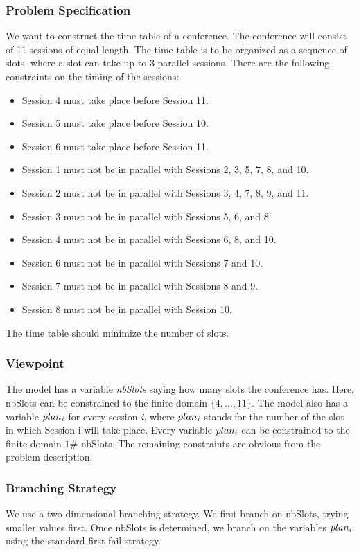 \documentclass[a4paper,halfparskip]{scrartcl}
\newcommand{\dom}[2]{\ensuremath{\{#1,\dots,#2\}}}
\begin{document}
\subsubsection{Problem Specification}
We want to construct the time table of a conference. 
The conference will consist of 11 sessions of equal length. 
The time table is to be organized as a sequence of slots, 
where a slot can take up to 3 parallel sessions. There are 
the following constraints on the timing of the sessions: 
\begin{itemize}
\item
Session 4 must take place before Session 11.
\item
Session 5 must take place before Session 10.
\item
Session 6 must take place before Session 11.
\item
Session 1 must not be in parallel with Sessions 2, 3, 5, 7, 8, and 10. 
\item
Session 2 must not be in parallel with Sessions 3, 4, 7, 8, 9, and 11. 
\item
Session 3 must not be in parallel with Sessions 5, 6, and 8. 
\item
Session 4 must not be in parallel with Sessions 6, 8, and 10. 
\item
Session 6 must not be in parallel with Sessions 7 and 10. 
\item
Session 7 must not be in parallel with Sessions 8 and 9. 
\item
Session 8 must not be in parallel with Session 10. 
\end{itemize}
The time table should minimize the number of slots.  

\subsubsection{Viewpoint}
The model has a variable \emph{nbSlots} saying how many slots 
the conference has. Here, nbSlots can be constrained to the finite 
domain $ \dom{4}{11} $. The model also has a variable $\emph{plan}_i $ for 
every session \emph{i}, where $\emph{plan}_i $ stands 
for the number of the slot in which Session i will take place. 
Every variable $\emph{plan}_i $ can be constrained to the finite 
domain $ 1 \# $ nbSlots. The remaining constraints are obvious from 
the problem description. 

\subsubsection{Branching Strategy}
We use a two-dimensional branching strategy. 
We first branch on nbSlots, trying smaller values first. 
Once nbSlots is determined, we branch on the variables $\emph{plan}_i $  
using the standard first-fail strategy. 
\end{document}
